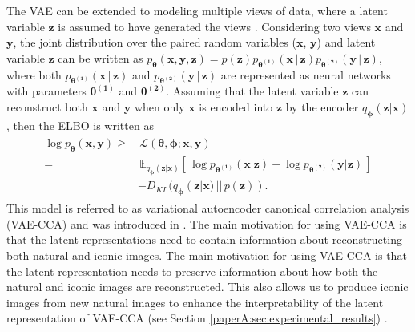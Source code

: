 The VAE can be extended to modeling multiple views of data, where a latent variable $\mathbf{z}$ is assumed to have generated the views . Considering two views $\mathbf{x}$ and $\mathbf{y}$, the joint distribution over the paired random variables ($\mathbf{x}$, $\mathbf{y}$) and latent variable $\mathbf{z}$ can be written as $p_{\boldsymbol{\theta}}(\mathbf{x}, \mathbf{y}, \mathbf{z}) = p(\mathbf{z})p_{\boldsymbol{\theta^{(1)}}}(\mathbf{x}\,|\,\mathbf{z})p_{\boldsymbol{\theta^{(2)}}}(\mathbf{y}\,|\,\mathbf{z})$, where both $p_{\boldsymbol{\theta^{(1)}}}(\mathbf{x}\,|\,\mathbf{z})$ and $p_{\boldsymbol{\theta^{(2)}}}(\mathbf{y}\,|\,\mathbf{z})$ are represented as neural networks with parameters $\boldsymbol{\theta^{(1)}}$ and $\boldsymbol{\theta^{(2)}}$. Assuming that the latent variable $\mathbf{z}$ can reconstruct both $\mathbf{x}$ and $\mathbf{y}$ when only $\mathbf{x}$ is encoded into $\mathbf{z}$ by the encoder $q_{\boldsymbol{\phi}}(\mathbf{z}|\mathbf{x})$, then the ELBO is written as 
\begin{align}
\begin{split}\label{eq:vcca-loss}
\log p_{\boldsymbol{\theta}}(\mathbf{x}, \mathbf{y}) \geq & \, \mathcal{L}(\boldsymbol{\theta}, \boldsymbol{\phi}; \mathbf{x}, \mathbf{y}) \\ 
= & \,  \mathbb{E}_{q_{\boldsymbol{\phi}}(\mathbf{z}|\mathbf{x})}\left[\, \log p_{\boldsymbol{\theta^{(1)}}}(\mathbf{x} | \mathbf{z}) + \log p_{\boldsymbol{\theta^{(2)}}}(\mathbf{y} | \mathbf{z}) \,\right] \\ 
& -D_{KL}(q_{\boldsymbol{\phi}}(\mathbf{z}|\mathbf{x})\,||\,p(\mathbf{z})) .
\end{split}
\end{align}  
This model is referred to as variational autoencoder canonical correlation analysis (VAE-CCA) and was introduced in . The main motivation for using VAE-CCA is that the latent representations need to contain information about reconstructing both natural and iconic images.
The main motivation for using VAE-CCA is that 
the latent representation needs to preserve information about how both the natural and iconic images are reconstructed. This also allows us to produce iconic images from new natural images to enhance the interpretability of the latent representation of VAE-CCA (see Section \ref{paperA:sec:experimental_results}) .


